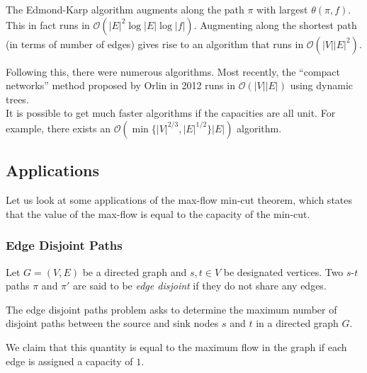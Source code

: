 The Edmond-Karp algorithm augments along the path $\pi$ with largest $\theta(\pi, f)$. This in fact runs in $\mathcal{O}(|E|^2\log |E| \log |f|)$. Augmenting along the shortest path (in terms of number of edges) gives rise to an algorithm that runs in $\mathcal{O}(|V||E|^2)$.

Following this, there were numerous algorithms. Most recently, the ``compact networks'' method proposed by Orlin in 2012 runs in $\mathcal{O}(|V||E|)$ using dynamic trees.\\
It is possible to get much faster algorithms if the capacities are all unit. For example, there exists an $\mathcal{O}(\min\{|V|^{2/3}, |E|^{1/2}\}|E|)$ algorithm.

\subsection{Applications}

Let us look at some applications of the max-flow min-cut theorem, which states that the value of the max-flow is equal to the capacity of the min-cut.

\subsubsection{Edge Disjoint Paths}
\label{subsubsec: edge-disjoint paths}

Let $G=(V,E)$ be a directed graph and $s,t\in V$ be designated vertices. Two $s$-$t$ paths $\pi$ and $\pi'$ are said to be \textit{edge disjoint} if they do not share any edges.

The edge disjoint paths problem asks to determine the maximum number of disjoint paths between the source and sink nodes $s$ and $t$ in a directed graph $G$.

We claim that this quantity is equal to the maximum flow in the graph if each edge is assigned a capacity of $1$.


